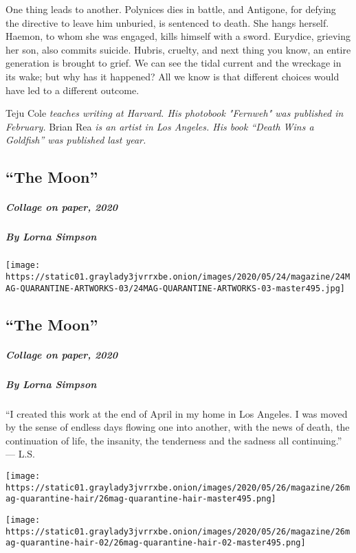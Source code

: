 One thing leads to another. Polynices dies in battle, and Antigone, for
defying the directive to leave him unburied, is sentenced to death. She
hangs herself. Haemon, to whom she was engaged, kills himself with a
sword. Eurydice, grieving her son, also commits suicide. Hubris,
cruelty, and next thing you know, an entire generation is brought to
grief. We can see the tidal current and the wreckage in its wake; but
why has it happened? All we know is that different choices would have
led to a different outcome.

Teju Cole \emph{teaches writing at Harvard. His photobook "Fernweh" was
published in February.} Brian Rea \emph{is an artist in Los Angeles. His
book ``Death Wins a Goldfish'' was published last year.}

\hypertarget{the-moon}{%
\subsection{``The Moon''}\label{the-moon}}

\hypertarget{collage-on-paper-2020}{%
\subparagraph{Collage on paper, 2020}\label{collage-on-paper-2020}}

\hypertarget{by-lorna-simpson}{%
\subparagraph{By Lorna Simpson}\label{by-lorna-simpson}}

\texttt{[image: https://static01.graylady3jvrrxbe.onion/images/2020/05/24/magazine/24MAG-QUARANTINE-ARTWORKS-03/24MAG-QUARANTINE-ARTWORKS-03-master495.jpg]}

\hypertarget{the-moon-1}{%
\subsection{``The Moon''}\label{the-moon-1}}

\hypertarget{collage-on-paper-2020-1}{%
\subparagraph{Collage on paper, 2020}\label{collage-on-paper-2020-1}}

\hypertarget{by-lorna-simpson-1}{%
\subparagraph{By Lorna Simpson}\label{by-lorna-simpson-1}}

``I created this work at the end of April in my home in Los Angeles. I
was moved by the sense of endless days flowing one into another, with
the news of death, the continuation of life, the insanity, the
tenderness and the sadness all continuing.'' --- L.S.

\texttt{[image: https://static01.graylady3jvrrxbe.onion/images/2020/05/26/magazine/26mag-quarantine-hair/26mag-quarantine-hair-master495.png]}

\texttt{[image: https://static01.graylady3jvrrxbe.onion/images/2020/05/26/magazine/26mag-quarantine-hair-02/26mag-quarantine-hair-02-master495.png]}

